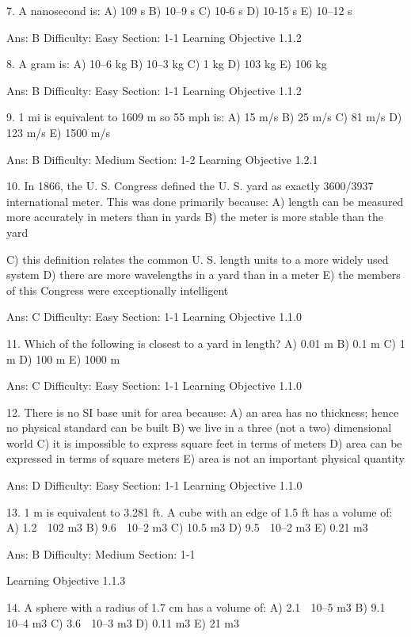 7.  A nanosecond is: 
A)  109 s 
B)  10–9 s 
C)  10-6 s 
D)  10-15 s 
E)  10–12 s

Ans:  B
Difficulty:  Easy
Section:  1-1
Learning Objective 1.1.2

8.  A gram is: 
A)  10–6 kg 
B)  10–3 kg 
C)  1 kg 
D)  103 kg 
E)  106 kg 

Ans:  B
Difficulty:  Easy
Section:  1-1
Learning Objective 1.1.2

9.  1 mi is equivalent to 1609 m so 55 mph is: 
A)  15 m/s 
B)  25 m/s 
C)  81 m/s 
D)  123 m/s 
E)  1500 m/s 

Ans:  B
Difficulty:  Medium
Section:  1-2
Learning Objective 1.2.1

10.  In 1866, the U. S. Congress defined the U. S. yard as exactly 3600/3937 international meter. This was done primarily because: 
A)  length can be measured more accurately in meters than in yards 
B)  the meter is more stable than the yard 



C)  this definition relates the common U. S. length units to a more widely used system
D)  there are more wavelengths in a yard than in a meter
E)  the members of this Congress were exceptionally intelligent

Ans:  C
Difficulty:  Easy
Section:  1-1
Learning Objective 1.1.0


11.  Which of the following is closest to a yard in length? 
A)  0.01 m 
B)  0.1 m 
C)  1 m 
D)  100 m 
E)  1000 m 

Ans:  C
Difficulty:  Easy
Section:  1-1
Learning Objective 1.1.0


12.  There is no SI base unit for area because: 
A)  an area has no thickness; hence no physical standard can be built
B)  we live in a three (not a two) dimensional world 
C)  it is impossible to express square feet in terms of meters
D)  area can be expressed in terms of square meters
E)  area is not an important physical quantity 

Ans:  D
Difficulty:  Easy
Section:  1-1
Learning Objective 1.1.0


13.  1 m is equivalent to 3.281 ft.  A cube with an edge of 1.5 ft has a volume of:
A)  1.2  102 m3
B)  9.6  10–2 m3
C)  10.5 m3
D)  9.5  10–2 m3
E)  0.21 m3

Ans:  B
Difficulty:  Medium
Section:  1-1



Learning Objective 1.1.3

14.  A sphere with a radius of 1.7 cm has a volume of: 
A)  2.1  10–5 m3
B)  9.1  10–4 m3
C)  3.6  10–3 m3
D)  0.11 m3
E)  21 m3

